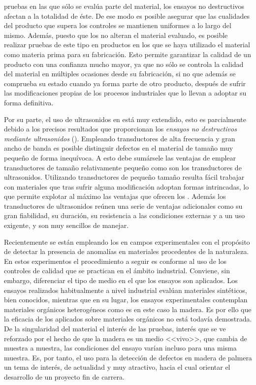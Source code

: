 pruebas en las que sólo se evalúa parte del material, los ensayos no
destructivos afectan a la totalidad de éste. De ese modo es posible
asegurar que las cualidades del producto que supera los controles se
mantienen uniformes a lo largo del mismo. Además, puesto que los 
no alteran el material evaluado, es posible realizar pruebas de este tipo
en productos en los que se haya utilizado el material como materia prima
para su fabricación. Esto permite garantizar la calidad de un producto con
una confianza mucho mayor, ya que no sólo se controla la calidad del
material en múltiples ocasiones desde su fabricación, si no que además se
comprueba su estado cuando ya forma parte de otro producto, después de
sufrir las modificaciones propias de los procesos industriales que lo
llevan a adoptar su forma definitiva.

Por su parte, el uso de ultrasonidos en  está muy extendido, esto
es parcialmente debido a los precisos resultados que proporcionan los
\emph{ensayos no destructivos mediante ultrasonidos} ().
Empleando transductores de alta frecuencia y gran ancho de banda es posible
distinguir defectos en el material de tamaño muy pequeño de forma
inequívoca. A esto debe sumársele las ventajas de emplear transductores de
tamaño relativamente pequeño como son los transductores de ultrasonidos.
Utilizando transductores de pequeño tamaño resulta fácil trabajar con
materiales que tras sufrir alguna modificación adoptan formas intrincadas,
lo que permite explotar al máximo las ventajas que ofrecen los .
Además los transductores de ultrasonidos reúnen una serie de ventajas
adicionales como su gran fiabilidad, su duración, su resistencia a las
condiciones externas y a un uso exigente, y son muy sencillos de
manejar.

Recientemente se están empleando los  en campos experimentales
con el propósito de detectar la presencia de anomalías en materiales
procedentes de la naturaleza. En estos experimentos el procedimiento a
seguir es conforme al uso de los controles de calidad que se practican en
el ámbito industrial. Conviene, sin embargo, diferenciar el tipo de medio
en el que los ensayos son aplicados. Los ensayos realizados habitualmente a
nivel industrial evalúan materiales sintéticos, bien conocidos, mientras
que en su lugar, los ensayos experimentales contemplan materiales orgánicos
heterogéneos como es en este caso la madera. Es por ello que la eficacia de
los  aplicados sobre materiales orgánicos no está todavía
demostrada. De la singularidad del material el interés de las pruebas,
interés que se ve reforzado por el hecho de que la madera es un medio
<<vivo>>, que cambia de muestra a muestra, las condiciones del ensayo
varían incluso para una misma muestra. Es, por tanto, el uso 
para la detección de defectos en madera de palmera un tema de interés, de
actualidad y muy atractivo, hacia el cual orientar el desarrollo de un
proyecto fin de carrera.


